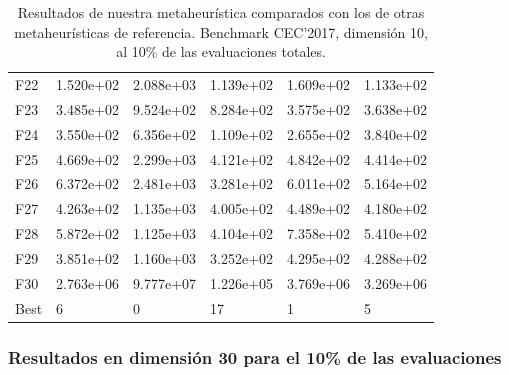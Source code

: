 \documentclass{article}
\begin{document}
\begin{table}[H]
\begin{tabular}{|l|lllll|}
	F22  &  1.520e+02 &  2.088e+03 &  1.139e+02 &  1.609e+02 &  1.133e+02 \\
	F23  &  3.485e+02 &  9.524e+02 &  8.284e+02 &  3.575e+02 &  3.638e+02 \\
	F24  &  3.550e+02 &  6.356e+02 &  1.109e+02 &  2.655e+02 &  3.840e+02 \\
	F25  &  4.669e+02 &  2.299e+03 &  4.121e+02 &  4.842e+02 &  4.414e+02 \\
	F26  &  6.372e+02 &  2.481e+03 &  3.281e+02 &  6.011e+02 &  5.164e+02 \\
	F27  &  4.263e+02 &  1.135e+03 &  4.005e+02 &  4.489e+02 &  4.180e+02 \\
	F28  &  5.872e+02 &  1.125e+03 &  4.104e+02 &  7.358e+02 &  5.410e+02 \\
	F29  &  3.851e+02 &  1.160e+03 &  3.252e+02 &  4.295e+02 &  4.288e+02 \\
	F30  &  2.763e+06 &  9.777e+07 &  1.226e+05 &  3.769e+06 &  3.269e+06 \\\hline
	Best &          6 &          0 &         17 &          1 &          5 \\
	\hline
\end{tabular}	
	\caption{Resultados de nuestra metaheurística comparados con los de otras metaheurísticas de referencia. Benchmark CEC'2017, dimensión 10, al 10\% de las evaluaciones totales.}
	\label{tab:10p-branch-10}
\end{table}

\subsubsection*{Resultados en dimensión 30 para el 10\% de las evaluaciones}
\end{document}
